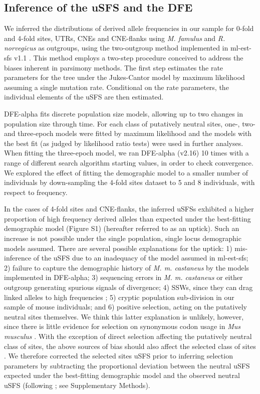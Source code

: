 \subsection{Inference of the uSFS and the DFE}
 
	We inferred the distributions of derived allele frequencies in our sample for 0-fold and 4-fold sites, UTRs, CNEs and CNE-flanks using \textit{M. famulus} and \textit{R. norvegicus} as outgroups, using the two-outgroup method implemented in ml-est-sfs v1.1 \citep{RN321}. This method employs a two-step procedure conceived to address the biases inherent in parsimony methods. The first step estimates the rate parameters for the tree under the Jukes-Cantor model by maximum likelihood assuming a single mutation rate. Conditional on the rate parameters, the individual elements of the uSFS are then estimated.
 
	DFE-alpha fits discrete population size models, allowing up to two changes in population size through time. For each class of putatively neutral sites, one-, two- and three-epoch models were fitted by maximum likelihood and the models with the best fit (as judged by likelihood ratio tests) were used in further analyses. When fitting the three-epoch model, we ran DFE-alpha (v2.16) 10 times with a range of different search algorithm starting values, in order to check convergence. We explored the effect of fitting the demographic model to a smaller number of individuals by down-sampling the 4-fold sites dataset to 5 and 8 individuals, with respect to frequency.

	In the cases of 4-fold sites and CNE-flanks, the inferred uSFSs exhibited a higher proportion of high frequency derived alleles than expected under the best-fitting demographic model (Figure S1) (hereafter referred to as an uptick). Such an increase is not possible under the single population, single locus demographic models assumed. There are several possible explanations for the uptick: 1) mis-inference of the uSFS due to an inadequacy of the model assumed in ml-est-sfs; 2) failure to capture the demographic history of \textit{M. m. castaneus} by the models implemented in DFE-alpha; 3) sequencing errors in \textit{M. m. castaneus} or either outgroup generating spurious signals of divergence; 4) SSWs, since they can drag linked alleles to high frequencies \citep{RN287,RN343}; 5) cryptic population sub-division in our sample of mouse individuals; and 6) positive selection, acting on the putatively neutral sites themselves. We think this latter explanation is unlikely, however, since there is little evidence for selection on synonymous codon usage in \textit{Mus musculus} \citep{RN195}. With the exception of direct selection affecting the putatively neutral class of sites, the above sources of bias should also affect the selected class of sites \citep{RN275, RN276, RN321}. We therefore corrected the selected sites uSFS prior to inferring selection parameters by subtracting the proportional deviation between the neutral uSFS expected under the best-fitting demographic model and the observed neutral uSFS (following \citealt{RN321}; see Supplementary Methods). 
 
